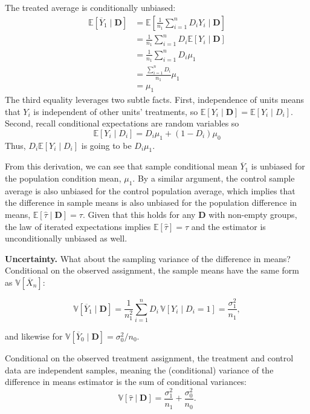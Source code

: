 \documentclass[
  13pt,
  letterpaper,
  DIV=11,
  numbers=noendperiod]{scrreprt}
\newcommand{\E}{\mathbb{E}}
\newcommand{\V}{\mathbb{V}}
\newcommand{\Xbar}{\overline{X}}
\newcommand{\Ybar}{\overline{Y}}
\theoremstyle{plain}
\theoremstyle{plain}
\theoremstyle{definition}
\theoremstyle{definition}
\theoremstyle{remark}
\begin{document}
The treated average is conditionally unbiased: \[
\begin{aligned}
\E[\Ybar_1 \mid \mathbf{D}] &= \E\left[\frac{1}{n_1} \sum_{i=1}^n D_iY_i \mid \mathbf{D}\right] \\
&= \frac{1}{n_1} \sum_{i=1}^n D_i \E[Y_i \mid \mathbf{D}] \\
&= \frac{1}{n_1} \sum_{i=1}^n D_i \mu_1 \\
&= \frac{\sum_{i=1}^n D_i}{n_1}  \mu_1  \\
&= \mu_1
\end{aligned}
\] The third equality leverages two subtle facts. First, independence of
units means that \(Y_i\) is independent of other units' treatments, so
\(\E[Y_i \mid \mathbf{D}] = \E[Y_i \mid D_i]\). Second, recall
conditional expectations are random variables so\\
\[
\E[Y_i \mid D_i] = D_i \mu_1 + (1 - D_i)\mu_0
\] Thus, \(D_i\E[Y_i \mid D_i]\) is going to be \(D_i \mu_1\).

From this derivation, we can see that sample conditional mean
\(\Ybar_1\) is unbiased for the population condition mean, \(\mu_1\). By
a similar argument, the control sample average is also unbiased for the
control population average, which implies that the difference in sample
means is also unbiased for the population difference in means,
\(\E[\widehat{\tau} \mid \mathbf{D}] = \tau\). Given that this holds for
any \(\mathbf{D}\) with non-empty groups, the law of iterated
expectations implies \(\E[\widehat{\tau}] = \tau\) and the estimator is
unconditionally unbiased as well.

\textbf{Uncertainty.} What about the sampling variance of the difference
in means? Conditional on the observed assignment, the sample means have
the same form as \(\V[\Xbar_n]\):

\[
\V[\Ybar_1 \mid \mathbf{D}] =\frac{1}{n_1^2}\sum_{i=1}^n D_i\,\V[Y_i \mid D_i = 1] = \frac{\sigma^2_1}{n_1},
\]

and likewise for \(\V[\Ybar_0 \mid \mathbf{D}] = \sigma^2_0/ n_0\).

Conditional on the observed treatment assignment, the treatment and
control data are independent samples, meaning the (conditional) variance
of the difference in means estimator is the sum of conditional
variances: \[
\V[\widehat{\tau} \mid \mathbf{D}] = \frac{\sigma^2_1}{n_1} + \frac{\sigma^2_0}{n_0}.
\]
\end{document}
